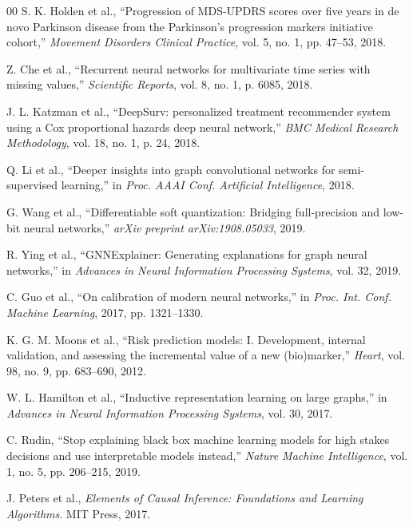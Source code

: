 \documentclass[conference]{IEEEtran}
\begin{document}
\begin{thebibliography}{00}
S. K. Holden et al., ``Progression of MDS-UPDRS scores over five years in de novo Parkinson disease from the Parkinson's progression markers initiative cohort,'' \textit{Movement Disorders Clinical Practice}, vol. 5, no. 1, pp. 47--53, 2018.

Z. Che et al., ``Recurrent neural networks for multivariate time series with missing values,'' \textit{Scientific Reports}, vol. 8, no. 1, p. 6085, 2018.

J. L. Katzman et al., ``DeepSurv: personalized treatment recommender system using a Cox proportional hazards deep neural network,'' \textit{BMC Medical Research Methodology}, vol. 18, no. 1, p. 24, 2018.

Q. Li et al., ``Deeper insights into graph convolutional networks for semi-supervised learning,'' in \textit{Proc. AAAI Conf. Artificial Intelligence}, 2018.

G. Wang et al., ``Differentiable soft quantization: Bridging full-precision and low-bit neural networks,'' \textit{arXiv preprint arXiv:1908.05033}, 2019.

R. Ying et al., ``GNNExplainer: Generating explanations for graph neural networks,'' in \textit{Advances in Neural Information Processing Systems}, vol. 32, 2019.

C. Guo et al., ``On calibration of modern neural networks,'' in \textit{Proc. Int. Conf. Machine Learning}, 2017, pp. 1321--1330.

K. G. M. Moons et al., ``Risk prediction models: I. Development, internal validation, and assessing the incremental value of a new (bio)marker,'' \textit{Heart}, vol. 98, no. 9, pp. 683--690, 2012.

W. L. Hamilton et al., ``Inductive representation learning on large graphs,'' in \textit{Advances in Neural Information Processing Systems}, vol. 30, 2017.

C. Rudin, ``Stop explaining black box machine learning models for high stakes decisions and use interpretable models instead,'' \textit{Nature Machine Intelligence}, vol. 1, no. 5, pp. 206--215, 2019.

J. Peters et al., \textit{Elements of Causal Inference: Foundations and Learning Algorithms}. MIT Press, 2017.


\end{thebibliography}
\end{document}
